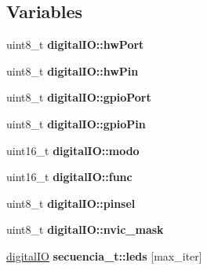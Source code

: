 \subsection*{Variables}
\begin{DoxyCompactItemize}
\item 
uint8\+\_\+t {\bfseries digital\+I\+O\+::hw\+Port}\hypertarget{group__operaciones_ga79691c4619ba92dbf4859aaa6e006531}{}\label{group__operaciones_ga79691c4619ba92dbf4859aaa6e006531}

\item 
uint8\+\_\+t {\bfseries digital\+I\+O\+::hw\+Pin}\hypertarget{group__operaciones_ga93d2e4a48daa464205632175fdb7288c}{}\label{group__operaciones_ga93d2e4a48daa464205632175fdb7288c}

\item 
uint8\+\_\+t {\bfseries digital\+I\+O\+::gpio\+Port}\hypertarget{group__operaciones_ga193f5c6819b21ca6b603d25f05b040ad}{}\label{group__operaciones_ga193f5c6819b21ca6b603d25f05b040ad}

\item 
uint8\+\_\+t {\bfseries digital\+I\+O\+::gpio\+Pin}\hypertarget{group__operaciones_gaeaf3b63ddbf55482742c6be93f702a03}{}\label{group__operaciones_gaeaf3b63ddbf55482742c6be93f702a03}

\item 
uint16\+\_\+t {\bfseries digital\+I\+O\+::modo}\hypertarget{group__operaciones_ga12a2837721a7cd69751ab8867c17dfc8}{}\label{group__operaciones_ga12a2837721a7cd69751ab8867c17dfc8}

\item 
uint16\+\_\+t {\bfseries digital\+I\+O\+::func}\hypertarget{group__operaciones_ga5f4e4ff78fb5f0f3e23063c73bbe0208}{}\label{group__operaciones_ga5f4e4ff78fb5f0f3e23063c73bbe0208}

\item 
uint8\+\_\+t {\bfseries digital\+I\+O\+::pinsel}\hypertarget{group__operaciones_gad98ce6ef3aa8fc24dd421300b870e6a2}{}\label{group__operaciones_gad98ce6ef3aa8fc24dd421300b870e6a2}

\item 
uint8\+\_\+t {\bfseries digital\+I\+O\+::nvic\+\_\+mask}\hypertarget{group__operaciones_ga036872d62c71dba6d8e5d25fc7fe2ef1}{}\label{group__operaciones_ga036872d62c71dba6d8e5d25fc7fe2ef1}

\item 
\hyperlink{structdigital_i_o}{digital\+IO} {\bfseries secuencia\+\_\+t\+::leds} \mbox{[}max\+\_\+iter\mbox{]}\hypertarget{group__operaciones_ga4634f0adb5fc59439ea03c048cceca5d}{}\label{group__operaciones_ga4634f0adb5fc59439ea03c048cceca5d}


\end{DoxyCompactItemize}
